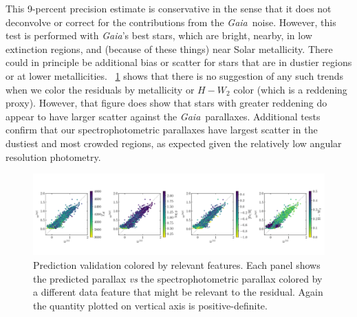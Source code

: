 \documentclass[modern]{aastex62}
\newcommand{\foreign}[1]{\textsl{#1}}
\newcommand{\project}[1]{\textsl{#1}}
\newcommand{\gaia}{\project{Gaia}}
\begin{document}
This 9-percent precision estimate is conservative in the sense that it does not
deconvolve or correct for the contributions from the \gaia\ noise.
However, this test is performed with
\gaia's best stars, which are bright, nearby, in low extinction regions, and
(because of these things) near Solar metallicity.
There could in principle be additional bias or scatter for stars that are in dustier
regions or at lower metallicities.
\figurename~\ref{fig:residuals} shows that
there is no suggestion of any such trends when we color the residuals by metallicity
or $H-W_2$ color (which is a reddening proxy).
However, that figure does show that stars with greater reddening do appear to have
larger scatter against the \gaia\ parallaxes.
Additional tests confirm that our spectrophotometric parallaxes have largest scatter
in the dustiest and most crowded regions, as expected given the relatively low angular resolution
photometry.
\begin{figure}
\includegraphics[width=\textwidth]{./residuals_training.pdf}
\caption{Prediction validation colored by relevant features.
  Each panel shows the predicted parallax \foreign{vs} the
  spectrophotometric parallax colored by a different
  data feature that might be relevant to the residual.
  Again the quantity plotted on vertical axis is positive-definite.\label{fig:residuals}}
\end{figure}
\end{document}
